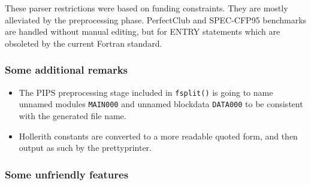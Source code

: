 \documentclass[a4paper]{report}
\begin{document}
These parser restrictions were based on funding constraints. They are
mostly alleviated by the preprocessing phase. PerfectClub and SPEC-CFP95
benchmarks are handled without manual editing, but for ENTRY statements
which are obsoleted by the current Fortran standard.


\subsubsection{Some additional remarks}

\begin{itemize}
\item The PIPS preprocessing stage included in \texttt{fsplit()} is going
  to name unnamed modules \texttt{MAIN000} and unnamed  blockdata
  \texttt{DATA000} to be consistent with the generated file name.

\item Hollerith constants are converted to a more readable quoted form,
  and then output as such by the prettyprinter.

\end{itemize}

\subsubsection{Some unfriendly features}
\end{document}
